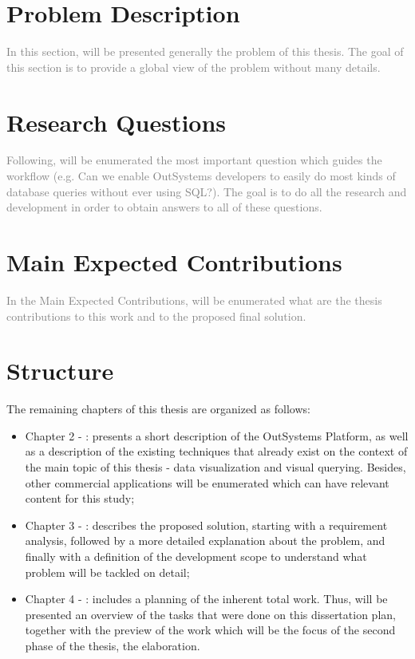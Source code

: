 \section{Problem Description}
\label{sec:problem_description}
\textcolor{gray}{In this section, will be presented generally the problem of this thesis. The goal of this section is to provide a global view of the problem without many details.}

\section{Research Questions}
\label{sec:research_questions}
\textcolor{gray}{Following, will be enumerated the most important question which guides the workflow (e.g. Can we enable OutSystems developers to easily do most kinds of database queries without ever using SQL?). The goal is to do all the research and development in order to obtain answers to all of these questions.}

\section{Main Expected Contributions}
\label{sec:main_exp_contributions}
\textcolor{gray}{In the Main Expected Contributions, will be enumerated what are the thesis contributions to this work and to the proposed final solution.}

\section{Structure}
\label{sec:structure}

The remaining chapters of this thesis are organized as follows:

\begin{itemize}
  \item Chapter 2 - : presents a short description of the OutSystems Platform, as well as a description of the existing techniques that already exist on the context of the main topic of this thesis - data visualization and visual querying. Besides, other commercial applications will be enumerated which can have relevant content for this study;
  \item Chapter 3 - : describes the proposed solution, starting with a requirement analysis, followed by a more detailed explanation about the problem, and finally with a definition of the development scope to understand what problem will be tackled on detail;
  \item Chapter 4 - : includes a planning of the inherent total work. Thus, will be presented an overview of the tasks that were done on this dissertation plan, together with the preview of the work which will be the focus of the second phase of the thesis, the elaboration.
\end{itemize}
